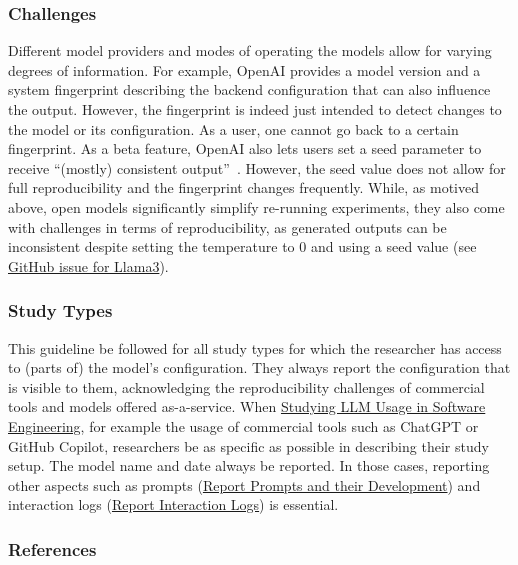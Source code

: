 \subsubsection{Challenges}

Different model providers and modes of operating the models allow for varying degrees of information.
For example, OpenAI provides a model version and a system fingerprint describing the backend configuration that can also influence the output.
However, the fingerprint is indeed just intended to detect changes to the model or its configuration.
As a user, one cannot go back to a certain fingerprint.
As a beta feature, OpenAI also lets users set a seed parameter to receive ``(mostly) consistent output''~\cite{OpenAI23}.
However, the seed value does not allow for full reproducibility and the fingerprint changes frequently. 
While, as motived above, open models significantly simplify re-running experiments, they also come with challenges in terms of reproducibility, as generated outputs can be inconsistent despite setting the temperature to 0 and using a seed value (see \href{https://github.com/ollama/ollama/issues/5321}{GitHub issue for Llama3}).


\subsubsection{Study Types}

This guideline \must be followed for all study types for which the researcher has access to (parts of) the model's configuration.
They \must always report the configuration that is visible to them, acknowledging the reproducibility challenges of commercial tools and models offered as-a-service. 
When \href{/study-types/#studying-llm-usage-in-software-engineering}{Studying LLM Usage in Software Engineering}, for example the usage of commercial tools such as ChatGPT or GitHub Copilot, researchers \must be as specific as possible in describing their study setup.
The model name and date \must always be reported.
In those cases, reporting other aspects such as prompts (\href{/guidelines/#report-prompts-and-their-development}{Report Prompts and their Development}) and interaction logs (\href{/guidelines//#report-interaction-logs}{Report Interaction Logs}) is essential.



\subsubsection{References}





